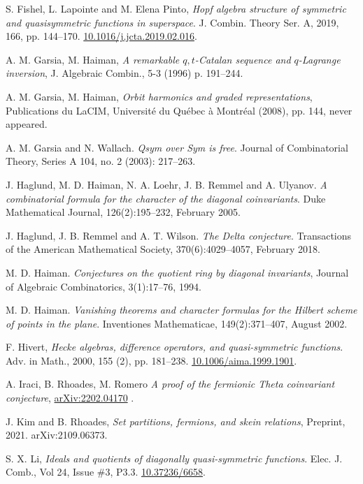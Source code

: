 \documentclass[11pt]{amsart}
\theoremstyle{definition}
\numberwithin{equation}{section}
\begin{document}
\begin{thebibliography}{999}
S. Fishel, L. Lapointe and M. Elena Pinto,
\textit{Hopf algebra structure of symmetric and quasisymmetric
              functions in superspace}.
 {J. Combin. Theory Ser. A}, 2019, 166, pp.  {144--170}.
\href{https://doi-org/10.1016/j.jcta.2019.02.016}{10.1016/j.jcta.2019.02.016}.

 A. M. Garsia, M. Haiman,
\textit {A remarkable {$q,t$}-{C}atalan sequence and {$q$}-{L}agrange inversion},
J. Algebraic Combin., 5-3 (1996) p. 191--244.
     
 A. M. Garsia, M. Haiman,
\textit{Orbit harmonics and graded representations},
Publications du LaCIM, Universit\'e du Qu\'ebec \`a Montr\'eal (2008), pp. 144,
never appeared.

 A. M. Garsia and N. Wallach.
\textit{Qsym over Sym is free}.
Journal of Combinatorial Theory, Series A 104, no. 2 (2003): 217--263.

 J. Haglund, M. D. Haiman, N. A. Loehr, J. B. Remmel and A. Ulyanov.
\textit{A combinatorial formula for the character of the diagonal coinvariants}.
Duke Mathematical Journal, 126(2):195--232, February 2005.

 J. Haglund, J. B. Remmel and A. T. Wilson.
\textit{The Delta conjecture}.
Transactions of the American Mathematical Society, 370(6):4029--4057, February 2018.

 M. D. Haiman.
\textit{Conjectures on the quotient ring by diagonal invariants},
Journal of Algebraic Combinatorics, 3(1):17--76, 1994.

 M. D. Haiman.
\textit{Vanishing theorems and character formulas for the Hilbert scheme of points in the plane}.
Inventiones Mathematicae, 149(2):371--407, August 2002.

 F. Hivert,
\textit{Hecke algebras, difference operators, and quasi-symmetric functions}.
Adv. in Math., 2000, 155 (2), pp. 181--238.
\href{https://doi-org/10.1006/aima.1999.1901}{10.1006/aima.1999.1901}.

 A. Iraci, B. Rhoades, M. Romero
\textit{A proof of the fermionic Theta coinvariant conjecture},
\href{https://arxiv.org/abs/2202.04170}{arXiv:2202.04170} .

 J. Kim and B. Rhoades,
\textit{Set partitions, fermions, and skein relations}, Preprint, 2021. arXiv:2109.06373.

 S. X. Li,
\textit{Ideals and quotients of diagonally quasi-symmetric functions}.
Elec. J. Comb., Vol 24, Issue \#3, P3.3.
\href{https://doi.org/10.37236/6658}{10.37236/6658}.


\end{thebibliography}
\end{document}
